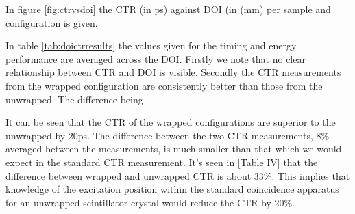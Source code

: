 In figure \ref{fig:ctrvsdoi} the CTR (in ps) against DOI (in (mm) per sample and configuration is given. 

In table \ref{tab:doictrresults} the values given for the timing and energy performance are averaged across the DOI. Firstly we note that no clear relationship between CTR and DOI is visible. Secondly the CTR measurements from the wrapped configuration are consistently better than those from the unwrapped. The difference being 


It can be seen that the CTR of the wrapped configurations are superior to the unwrapped by 20ps. The difference between the two CTR measurements, 8\% averaged between the measurements, is much smaller than that which we would expect in the standard CTR measurement. It's seen in [Table IV]\cite{r_Paganoni_Pauwels_et_al__2011} that the difference between wrapped and unwrapped CTR is about 33\%. This implies that knowledge of the excitation position within the standard coincidence apparatus for an unwrapped scintillator crystal would reduce the CTR by 20\%. 

